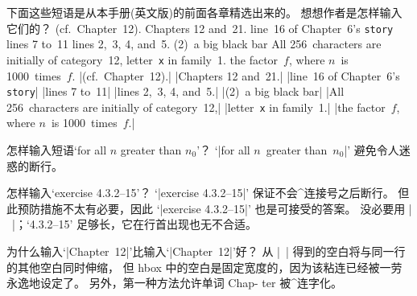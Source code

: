 \exercise 下面这些短语是从本手册(英文版)的前面各章精选出来的。%
想想作者是怎样输入它们的？
\begindisplay
(cf.~Chapter~12).\cr
Chapters 12 and~21.\cr
line~16 of Chapter~6's {\tt story}\cr
lines 7 to~11\cr
lines 2,~3, 4, and~5.\cr
(2)~a big black bar\cr
All 256~characters are initially of category~12,\cr
letter~{\tt x} in family~1.\cr
the factor~$f$, where $n$~is 1000~times~$f$.\cr
\enddisplay
\answer|(cf.~Chapter~12).|\parbreak
|Chapters 12 and~21.|\parbreak
|line~16 of Chapter~6's {\tt story}|\parbreak
|lines 7 to~11|\parbreak
|lines 2,~3, 4, and~5.|\parbreak
|(2)~a big black bar|\parbreak
|All 256~characters are initially of category~12,|\parbreak
|letter~{\tt x} in family~1.|\parbreak
|the factor~$f$, where $n$~is 1000~times~$f$.|

\exercise 怎样输入短语`for all $n$ greater than
$n_0$'\thinspace ？
\answer `|for all $n$~greater than~$n_0$|' 避免令人迷惑的断行。

\exercise 怎样输入`exercise 4.3.2--15'\thinspace ？
\answer `|exercise \hbox{4.3.2--15}|' 保证不会^{连接号}之后断行。
但此预防措施不太有必要，因此 `|exercise 4.3.2--15|' 也是可接受的答案。
没必要用 |~|；`\hbox{4.3.2--15}' 足够长，它在行首出现也无不合适。

\exercise 为什么输入`|Chapter~12|'比输入`|\hbox{Chapter 12}|'好？
\answer 从 |~| 得到的空白将与同一行的其他空白同时伸缩，
但 hbox 中的空白是固定宽度的，因为该粘连已经被一劳永逸地设定了。
另外，第一种方法允许单词 Chap-\break
ter 被^{连字化}。

